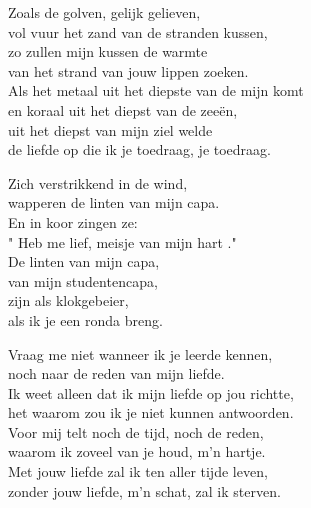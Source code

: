 \clearpage
\begin{translation}
Zoals de golven, gelijk gelieven,\\
vol vuur het zand van de stranden kussen,\\
zo zullen mijn kussen de warmte\\
van het strand van jouw lippen zoeken.\\
Als het metaal uit het diepste van de mijn komt\\
en koraal uit het diepst van de zeeën,\\
uit het diepst van mijn ziel welde\\
de liefde op die ik je toedraag, je toedraag.\vspace{\wlskip}

Zich verstrikkend in de wind,\\
wapperen de linten van mijn capa.\\
En in koor zingen ze:\\
" Heb me lief, meisje van mijn hart ."\\
De linten van mijn capa,\\
van mijn studentencapa,\\
zijn als klokgebeier,\\
als ik je een ronda breng.\vspace{\wlskip}

Vraag me niet wanneer ik je leerde kennen,\\
noch naar de reden van mijn liefde.\\
Ik weet alleen dat ik mijn liefde op jou richtte,\\
het waarom zou ik je niet kunnen antwoorden.\\
Voor mij telt noch de tijd, noch de reden,\\
waarom ik zoveel van je houd, m'n hartje.\\
Met jouw liefde zal ik ten aller tijde leven,\\
zonder jouw liefde, m'n schat, zal ik sterven.
\end{translation}
